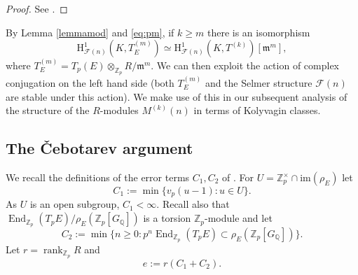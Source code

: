 \documentclass[a4paper,10pt]{amsart}
\numberwithin{equation}{section}
\numberwithin{equation}{section}
\theoremstyle{plain}
\theoremstyle{definition}
\theoremstyle{definition}
\theoremstyle{plain}
\theoremstyle{plain}
\theoremstyle{plain}
\theoremstyle{plain}
\DeclareMathOperator{\ord}{ord}
\newcommand{\ind}{\operatorname{ind}}
\newcommand{\Z}{\mathbb{Z}}
\newcommand{\Q}{\mathbb{Q}}
\DeclareMathOperator{\End}{End}
\newcommand{\Fcal}{\mathcal{F}}
\newcommand{\fm}{\mathfrak{m}}
\newcommand{\rH}{\mathrm{H}}
\begin{document}
\begin{proof} See \cite[Prop.~3.3.2]{eisenstein}.
\end{proof}


By Lemma \ref{lemmamod} and \eqref{eq:pm}, if $k\geq m$ there is an isomorphism
\begin{equation}\label{eq:pmtorsion}
\rH^1_{\Fcal(n)}(K,T_E^{(m)})\simeq \rH^1_{\Fcal(n)}(K,T^{(k)})[\fm^{m}],
\end{equation}
where $T_E^{(m)}=T_p(E)\otimes_{\Z_p} R/\fm^m$.  We can then exploit the action of complex conjugation on the left hand side
(both $T_E^{(m)}$ and the Selmer structure $\Fcal(n)$ are stable under this action).   We make use of this in our subsequent analysis
of the structure of the $R$-modules $M^{(k)}(n)$ in terms of Kolyvagin classes. 




\subsection{The \v{C}ebotarev argument}\label{seccheb}
We recall the definitions of the error terms $C_1,C_2$ of \cite[$\S$3.3.1]{eisenstein}. For $U = \Z_p^\times\cap \mathrm{im}(\rho_E)$ let
\[
C_1 := \min\{v_p(u-1)\colon u\in U\}.
\]
As $U$ is an open subgroup, $C_1<\infty$.
Recall also that $\End_{\Z_p}(T_pE)/\rho_E(\Z_p[G_{\Q}])$ is a torsion $\Z_p$-module and let
\[
C_2:=\min\bigl\{ n\geqslant 0 \colon p^n\End_{\Z_p}(T_pE)\subset\rho_E(\Z_p[G_{\Q}])\bigr\}.
\]
Let $r=\operatorname{rank}_{\Z_p}R$ and 
\[
e:=r(C_1+C_2).
\]
\end{document}

